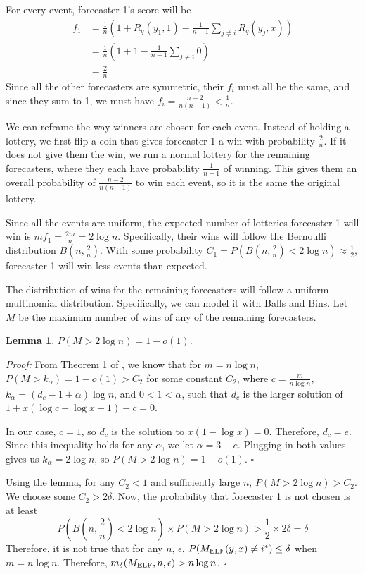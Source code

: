 \documentclass[letterpaper,12pt]{article}
\newcommand{\1}{\mathbbm{1}}
\newcommand*{\QED}{\hfill\ensuremath{\square}}%
\newtheorem{lemma}[theorem]{Lemma}
\begin{document}
For every event, forecaster 1's score will be 
\begin{align*}
  f_1 &= \frac{1}{n}\left(1 + R_q(y_1, 1) - \frac{1}{n-1} \sum_{j \neq i} R_q(y_j, x) \right) \\
      &= \frac{1}{n}\left(1 + 1 - \frac{1}{n-1} \sum_{j \neq i} 0 \right)\\
      &= \frac{2}{n}
\end{align*}
Since all the other forecasters are symmetric, their $f_i$ must all be the same, and since they sum to 1, we must have $f_i = \frac{n-2}{n(n-1)} < \frac{1}{n}$. 

We can reframe the way winners are chosen for each event. Instead of holding a lottery, we first flip a coin that gives forecaster 1 a win with probability $\frac{2}{n}$. If it does not give them the win, we run a normal lottery for the remaining forecasters, where they each have probability $\frac{1}{n-1}$ of winning. This gives them an overall probability of $\frac{n-2}{n(n-1)}$ to win each event, so it is the same the original lottery. 

Since all the events are uniform, the expected number of lotteries forecaster 1 will win is $m f_1 = \frac{2m}{n} = 2 \log n$. Specifically, their wins will follow the Bernoulli distribution $B(n, \frac{2}{n})$. With some probability $C_1 = P(B(n, \frac{2}{n}) < 2\log n) \approx \frac{1}{2}$, forecaster 1 will win less events than expected. 

The distribution of wins for the remaining forecasters will follow a uniform multinomial distribution. Specifically, we can model it with Balls and Bins. Let $M$ be the maximum number of wins of any of the remaining forecasters. 
\begin{lemma}
    $P(M > 2 \log n) = 1 - o(1)$.
\end{lemma}
\emph{Proof:}
From Theorem 1 of \citet{raab1998balls}, we know that for $m = n \log n$, $P(M > k_\alpha) = 1 - o(1) > C_2$ for some constant $C_2$, where $c = \frac{m}{n\log n}$, $k_\alpha = (d_c - 1 + \alpha) \log n$, and $0 < 1 < \alpha$, such that $d_c$ is the larger solution of $1 + x(\log c - \log x + 1) - c= 0$.

In our case, $c = 1$, so $d_c$ is the solution to $x (1 - \log x) = 0$. Therefore, $d_c = e$. Since this inequality holds for any $\alpha$, we let $\alpha = 3 - e$. Plugging in both values gives us $k_\alpha = 2 \log n$, so $P(M > 2 \log n) = 1 - o(1)$. \hfill \QED

Using the lemma, for any $C_2 < 1$ and sufficiently large $n$, $P(M > 2 \log n) > C_2$. We choose some $C_2 > 2\delta$. Now, the probability that forecaster 1 is not chosen is at least
\[
  P(B(n, \frac{2}{n}) < 2\log n) \times P(M > 2 \log n) > \frac{1}{2} \times 2\delta = \delta
\]
Therefore, it is not true that for any $n$, $\epsilon$, $P(M_{\mathrm{ELF}}(y, x) \neq i^*) \leq \delta$ when $m = n \log n$. Therefore, $m_\delta(M_{\mathrm{ELF}}, n, \epsilon) > n \log n$. 
\hfill \QED
\end{document}
